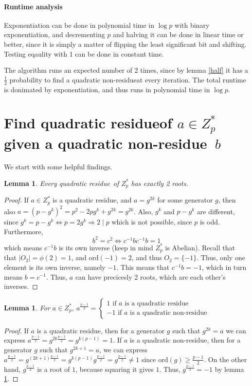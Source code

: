 \documentclass{article}
\newcommand{\z}{Z^*_p}
\newcommand{\ord}{\text{ord}}
\newcommand{\qr}{{quadratic residue}}
\newcommand{\qnr}{{quadratic non-residue}}
\newtheorem{lemma}[theorem]{Lemma}
\begin{document}
\paragraph{Runtime analysis}

Exponentiation can be done in polynomial time in $\log p$ with binary
exponentiation, and decrementing $p$ and halving it can be done in linear time
or better, since it is simply a matter of flipping the least significant bit and
shifting. Testing eqaulity with 1 can be done in constant time.

The algorithm runs an expected number of 2 times, since by lemma \ref{half} it
has a $\frac{1}{2}$ probability to find a \qnr at every iteration. The total
runtime is donimated by exponentiation, and thus runs in polynomial time in
$\log p$.

\section{Find \qr of $a \in \z$ given a \qnr~$b$}

We start with some helpful findings. 

\begin{lemma}\label{2roots}
  Every \qr~of $\z$ has exactly 2 roots.
\end{lemma}

\begin{proof}
  If $a \in \z$ is a \qr, and $a = g^{2k}$ for some generator $g$, then also $a
  = (p-g^k)^2 = p^2 - 2pg^k + g^{2k} = g^{2k}$. Also, $g^k$ and $p - g^k$ are
  different, since $g^k = p - g^k \Leftrightarrow p = 2g^k \Rightarrow 2 \mid p$
  which is not possible, since $p$ is odd. Furthermore,
  $$b^2 = c^2 \Leftrightarrow c^{-1}bc^{-1}b = 1$$
  which means $c^{-1}b$ is its own inverse (keep in mind $\z$ is Abelian).
  Recall that that $|O_2| = \phi(2) = 1$, and $\ord(-1) = 2$, and thus $O_2 =
  \{-1\}$. Thus, only one element is its own inverse, namely $-1$. This means
  that $c^{-1}b = -1$, which in turn means $b=c^{-1}$. Thus, $a$ can have
  precicesly 2 roots, which are each other's inverses.
\end{proof}

\begin{lemma}\label{plusminus}
  For $a \in \z$, $a^{\frac{p-1}{2}}= \begin{cases}1 \text{ if } a \text{ is a
      \qr } \\ -1 \text { if } a \text{ is a \qnr}\end{cases}$
\end{lemma}
\begin{proof}
  If $a$ is a \qr, then for a generator $g$ such that $g^{2k}=a$ we can express
  $a^{\frac{p-1}{2}} = g^{2k\frac{p-1}{2}} = g^{k(p-1)} = 1$. If $a$ is a \qnr,
  then for a generator $g$ such that $g^{2k + 1} = a$, we can express
  $a^{\frac{p-1}{2}} = g^{(2k+1)\frac{p-1}{2}} = g^{k(p-1)}g^{\frac{p-1}{2}}=
  g^{\frac{p-1}{2}} \not = 1$ since $\ord(g) \geq \frac{p-1}{2}$. On the other
  hand, $g^{\frac{p-1}{2}}$ is a root of $1$, because squaring it gives $1$.
  Thus, $g^{\frac{p-1}{2}} = -1$ by lemma \ref{2roots}.
\end{proof}
\end{document}
